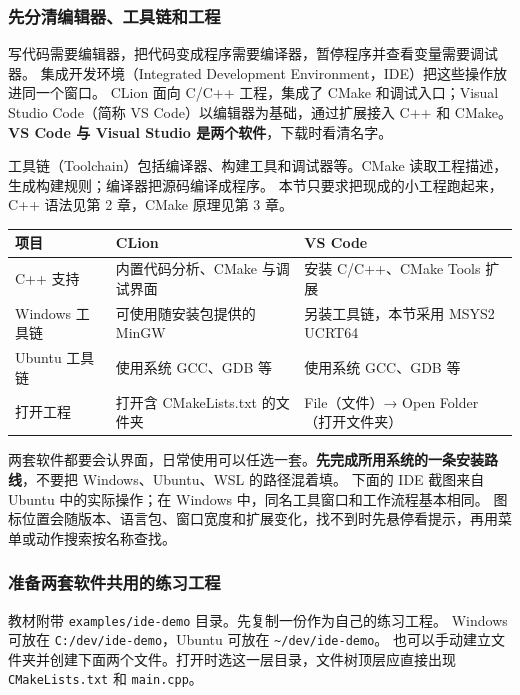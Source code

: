\label{sec:ide-tools}
\begingroup
\setlength{\emergencystretch}{3em}
\subsubsection{先分清编辑器、工具链和工程}

写代码需要编辑器，把代码变成程序需要编译器，暂停程序并查看变量需要调试器。
集成开发环境（Integrated Development Environment，IDE）把这些操作放进同一个窗口。
CLion 面向 C/C++ 工程，集成了 CMake 和调试入口；Visual Studio Code（简称 VS Code）以编辑器为基础，通过扩展接入 C++ 和 CMake。
\textbf{VS Code 与 Visual Studio 是两个软件}，下载时看清名字。

工具链（Toolchain）包括编译器、构建工具和调试器等。CMake 读取工程描述，生成构建规则；编译器把源码编译成程序。
本节只要求把现成的小工程跑起来，C++ 语法见第 2 章，CMake 原理见第 3 章。

\begin{center}
\begin{tabular}{p{}p{}p{}}
\toprule[1.5pt]
项目 & CLion & VS Code\\
\midrule[1pt]
C++ 支持 & 内置代码分析、CMake 与调试界面 & 安装 C/C++、CMake Tools 扩展\\
Windows 工具链 & 可使用随安装包提供的 MinGW & 另装工具链，本节采用 MSYS2 UCRT64\\
Ubuntu 工具链 & 使用系统 GCC、GDB 等 & 使用系统 GCC、GDB 等\\
打开工程 & 打开含 CMakeLists.txt 的文件夹 & File（文件）→ Open Folder（打开文件夹）\\
\bottomrule[1.5pt]
\end{tabular}
\end{center}

两套软件都要会认界面，日常使用可以任选一套。\textbf{先完成所用系统的一条安装路线}，不要把 Windows、Ubuntu、WSL 的路径混着填。
下面的 IDE 截图来自 Ubuntu 中的实际操作；在 Windows 中，同名工具窗口和工作流程基本相同。
图标位置会随版本、语言包、窗口宽度和扩展变化，找不到时先悬停看提示，再用菜单或动作搜索按名称查找。

\subsubsection{准备两套软件共用的练习工程}
教材附带 \texttt{examples/ide-demo} 目录。先复制一份作为自己的练习工程。
Windows 可放在 \texttt{C:/dev/ide-demo}，Ubuntu 可放在 \texttt{\textasciitilde/dev/ide-demo}。
也可以手动建立文件夹并创建下面两个文件。打开时选这一层目录，文件树顶层应直接出现 \texttt{CMakeLists.txt} 和 \texttt{main.cpp}。

